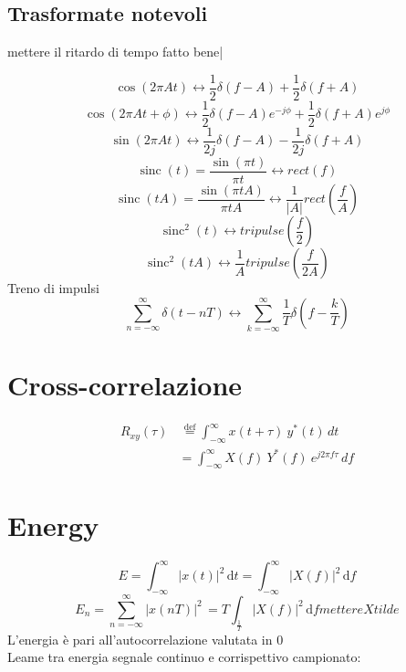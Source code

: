 \documentclass[12pt,a4paper,]{article}
\begin{document}
 \subsection{Trasformate notevoli}
 mettere il ritardo di tempo fatto bene|

\begin{equation}
  \cos(2\pi A t) \longleftrightarrow \frac{1}{2} \delta(f-A) + \frac{1}{2} \delta(f+A)
\end{equation}
\begin{equation}
  \cos(2\pi A t + \phi) \longleftrightarrow \frac{1}{2} \delta(f-A)e^{-j\phi} + \frac{1}{2} \delta(f+A)e^{j\phi}
\end{equation}
   \begin{equation}
 \sin(2\pi A t) \longleftrightarrow \frac{1}{2j} \delta(f-A) - \frac{1}{2j} \delta(f+A)
  \end{equation}
 \begin{equation}
 \operatorname{sinc}(t) = \frac{\sin(\pi t)}{\pi t}  \longleftrightarrow  rect(f) 
  \end{equation}
   \begin{equation}
 \operatorname{sinc}(tA) =  \frac{\sin(\pi tA)}{\pi tA}  \longleftrightarrow  \frac{1}{|A|} rect\left(\frac{f}{A}\right)
 \end{equation}
  \begin{equation}
 \operatorname{sinc}^{2}(t)   \longleftrightarrow  tripulse(\frac{f}{2})
 \end{equation}
 \begin{equation}
 \operatorname{sinc}^{2}(tA)   \longleftrightarrow \frac{1}{A}  tripulse(\frac{f}{2A})
  \end{equation}
 Treno di impulsi
 \begin{equation}
  \sum_{n=-\infty}^{\infty}  \delta(t-nT) \longleftrightarrow  \sum_{k=-\infty}^{\infty}  \frac{1}{T} \delta \left(f-\frac{k}{T}\right)
 \end{equation}
 
 \section{Cross-correlazione}
 \begin{align}
 R_{xy} (\tau) & \, \stackrel{\mathrm{def}}{=}  \int_{-\infty}^{\infty} x(t+\tau)\ y^*(t) \,dt \\
 & = \int_{-\infty}^{\infty} X(f)\ Y^*(f)\ e^{j2\pi f \tau} \,df
 \end{align}
\section{Energy}
\begin{equation}
E= \int_{-\infty}^{\infty} \! |x(t)|^{2}\, \mathrm{d}t = \int_{-\infty}^{\infty} \! |X(f)|^{2}\, \mathrm{d}f
\end{equation}
\begin{equation}
E_{n}= \sum_{n= -\infty}^{\infty} \! |x(nT)|^{2}\, = T \int_{\frac{1}{T}} \! |X(f)|^{2}\, \mathrm{d}f mettere X tilde
\end{equation}
L'energia è pari all'autocorrelazione valutata in 0\\
Leame tra energia segnale continuo e corrispettivo campionato:
\end{document}
